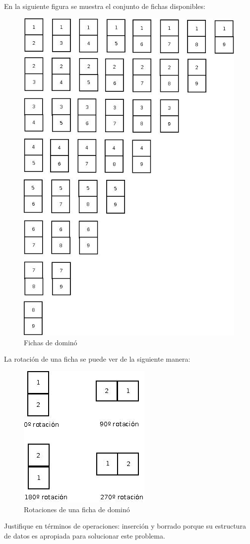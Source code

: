 \documentclass[twocolumn]{article}
\begin{document}
En la siguiente figura se muestra el conjunto de fichas disponibles:

\begin{figure}[H]
	\centering
	\includegraphics[scale=0.5]{domino-set.jpg}
	\caption{Fichas de dominó}
	\label{fig:dominoSet}
\end{figure}

La rotación de una ficha se puede ver de la siguiente manera:
\begin{figure}[H]
	\centering
	\includegraphics[scale=0.6]{Rotaciones.jpeg}
	\caption{Rotaciones de una ficha de dominó}
	\label{fig:dominoRotacion}
\end{figure}



Justifique en términos de operaciones: inserción y borrado porque su estructura de datos es apropiada para solucionar este problema.
\end{document}
